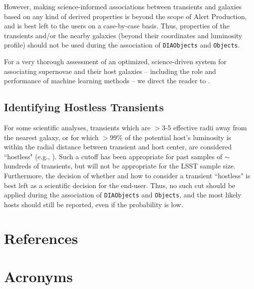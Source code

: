 \documentclass[DM,authoryear,toc]{lsstdoc}
\begin{document}
However, making science-informed associations between transients and galaxies based on any kind of derived properties is beyond the scope of Alert Production, and is best left to the users on a case-by-case basis. 
Thus, properties of the transients and/or the nearby galaxies (beyond their coordinates and luminosity profile) should not be used during the association of {\tt DIAObjects} and {\tt Objects}.

For a very thorough assessment of an optimized, science-driven system for associating supernovae and their host galaxies -- including the role and performance of machine learning methods -- we direct the reader to \citet{2016AJ....152..154G}.

\subsection{Identifying Hostless Transients}

For some scientific analyses, transients which are $>$3-5 effective radii away from the nearest galaxy, or for which $>99\%$ of the potential host's luminosity is within the radial distance between transient and host center, are considered ``hostless" (e.g., \citealt{2011ApJ...729..142S}).
Such a cutoff has been appropriate for past samples of $\sim$hundreds of transients, but will not be appropriate for the LSST sample size.
Furthermore, the decision of whether and how to consider a transient ``hostless" is best left as a scientific decision for the end-user.
Thus, no such cut should be applied during the association of {\tt DIAObjects} and {\tt Objects}, and the most likely hosts should still be reported, even if the probability is low.


\clearpage

\clearpage


\clearpage

\appendix
\section{References} \label{sec:bib}


\section{Acronyms} \label{sec:acronyms}

\end{document}
